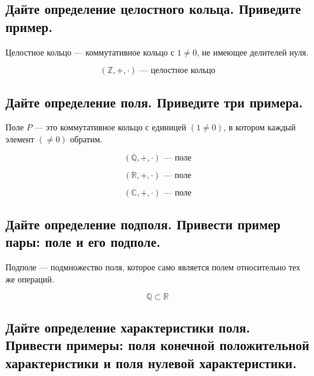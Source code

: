 \subsection{Дайте определение целостного кольца. Приведите пример.}

\begin{definition}
    Целостное кольцо --- коммутативное кольцо с $1 \neq 0$, не имеющее делителей нуля.
\end{definition}
\begin{example}
    \[
        (\mathbb{Z}, +, \cdot) \text{ --- целостное кольцо}
    \]
\end{example}


\subsection{Дайте определение поля. Приведите три примера.}

\begin{definition}
    Поле $P$ --- это коммутативное кольцо с единицей $(1 \neq 0)$, в котором каждый элемент $(\neq 0)$ обратим.
\end{definition}
\begin{example}
    \[
        (\mathbb{Q}, +, \cdot) \text{ --- поле}
    \]
\end{example}

\begin{example}
    \[
        (\mathbb{R}, +, \cdot) \text{ --- поле}
    \]
\end{example}

\begin{example}
    \[
        (\mathbb{C}, +, \cdot) \text{ --- поле}
    \]
\end{example}


\subsection{Дайте определение подполя. Привести пример пары: поле и его подполе.}

\begin{definition}
    Подполе --- подмножество поля, которое само является полем относительно тех же операций.
\end{definition}

\begin{example}
    \[
        \mathbb{Q} \subset \mathbb{R}
    \]
\end{example}


\subsection{Дайте определение характеристики поля. Привести примеры: поля конечной положительной характеристики и поля нулевой характеристики.}

